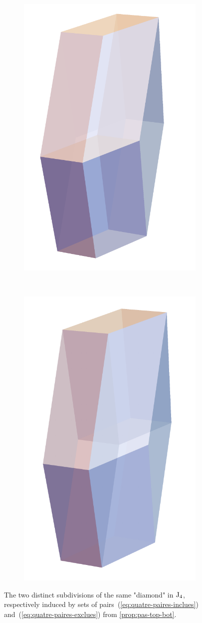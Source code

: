 \documentclass[10pt]{amsart}
\theoremstyle{remark}
\begin{document}
\begin{figure}[h!]
\centering
\begin{subfigure}{0.4\textwidth}
    \centering
        \includegraphics[width=0.6\linewidth]{paires-choisies.png} 
    \end{subfigure} ~
    \begin{subfigure}{0.4\textwidth}
    \centering
       \includegraphics[width=0.6\linewidth]{paires-exclues.png}
    \end{subfigure}
\caption{The two distinct subdivisions of the same "diamond" in $\mathrm{J}_4$, respectively induced by sets of pairs~(\ref{eq:quatre-paires-inclues}) and~(\ref{eq:quatre-paires-exclues}) from \cref{prop:pas-top-bot}.}
\label{fig:diamonds}
\end{figure}
\end{document}
